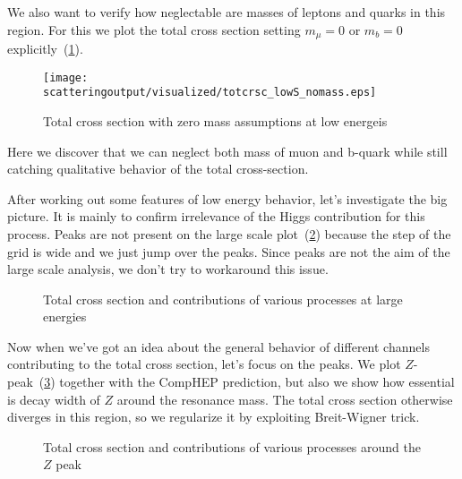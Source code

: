 \documentclass{article}
\newcommand{\scatteringoutput}{../scattering/output}
\begin{document}
We also want to verify how neglectable are masses of leptons and quarks in this region. For this we plot the total cross section setting $m_\mu = 0$ or $m_b = 0$ explicitly~(\cref{fig:totcrsc_lowS_nomass}).

\begin{figure}[H]
    \centering
    \texttt{[image: \\scatteringoutput/visualized/totcrsc\_lowS\_nomass.eps]}
    \caption{Total cross section with zero mass assumptions at low energeis}%
    \label{fig:totcrsc_lowS_nomass}
\end{figure}

Here we discover that we can neglect both mass of muon and b-quark while still catching qualitative behavior of the total cross-section.

After working out some features of low energy behavior, let's investigate the big picture. It is mainly to confirm irrelevance of the Higgs contribution for this process. Peaks are not present on the large scale plot~(\cref{fig:totcrsc_tail}) because the step of the grid is wide and we just jump over the peaks. Since peaks are not the aim of the large scale analysis, we don't try to workaround this issue.

\begin{figure}[H]
    \centering
    \hfill%
    \caption{Total cross section and contributions of various processes at large energies}%
    \label{fig:totcrsc_tail}
\end{figure}

Now when we've got an idea about the general behavior of different channels contributing to the total cross section, let's focus on the peaks. We plot $Z$-peak~(\ref{fig:totcrsc_Zpeak}) together with the CompHEP prediction, but also we show how essential is decay width of $Z$ around the resonance mass. The total cross section otherwise diverges in this region, so we regularize it by exploiting Breit-Wigner trick.

\begin{figure}[H]
    \centering
    \hfill%
    \caption{Total cross section and contributions of various processes around the $Z$ peak}%
    \label{fig:totcrsc_Zpeak}
\end{figure}
\end{document}
